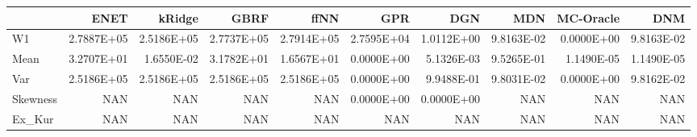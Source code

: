 \begin{tabular}{lrrrrrrrrr}
\toprule
{} &       ENET &     kRidge &       GBRF &       ffNN &        GPR &        DGN &        MDN &  MC-Oracle &        DNM \\
\midrule
W1       & 2.7887E+05 & 2.5186E+05 & 2.7737E+05 & 2.7914E+05 & 2.7595E+04 & 1.0112E+00 & 9.8163E-02 & 0.0000E+00 & 9.8163E-02 \\
Mean     & 3.2707E+01 & 1.6550E-02 & 3.1782E+01 & 1.6567E+01 & 0.0000E+00 & 5.1326E-03 & 9.5265E-01 & 1.1490E-05 & 1.1490E-05 \\
Var      & 2.5186E+05 & 2.5186E+05 & 2.5186E+05 & 2.5186E+05 & 0.0000E+00 & 9.9488E-01 & 9.8031E-02 & 0.0000E+00 & 9.8162E-02 \\
Skewness &        NAN &        NAN &        NAN &        NAN & 0.0000E+00 & 0.0000E+00 &        NAN &        NAN &        NAN \\
Ex\_Kur   &        NAN &        NAN &        NAN &        NAN &        NAN &        NAN &        NAN &        NAN &        NAN \\
\bottomrule
\end{tabular}
